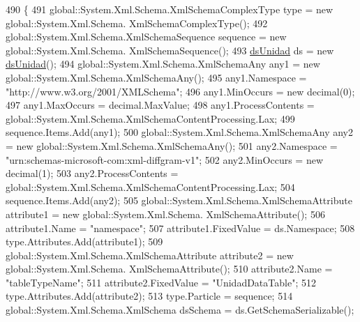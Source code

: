 \begin{DoxyCode}
490                                                                                                            
                               \{
491                 global::System.Xml.Schema.XmlSchemaComplexType type = \textcolor{keyword}{new} global::System.Xml.Schema.
      XmlSchemaComplexType();
492                 global::System.Xml.Schema.XmlSchemaSequence sequence = \textcolor{keyword}{new} global::System.Xml.Schema.
      XmlSchemaSequence();
493                 \hyperlink{class_proyecto___integrador__3_1_1ds_unidad_ab6be91d0b9503d2e08dacc48aaaf6446}{dsUnidad} ds = \textcolor{keyword}{new} \hyperlink{class_proyecto___integrador__3_1_1ds_unidad_ab6be91d0b9503d2e08dacc48aaaf6446}{dsUnidad}();
494                 global::System.Xml.Schema.XmlSchemaAny any1 = \textcolor{keyword}{new} global::System.Xml.Schema.XmlSchemaAny();
495                 any1.Namespace = \textcolor{stringliteral}{"http://www.w3.org/2001/XMLSchema"};
496                 any1.MinOccurs = \textcolor{keyword}{new} decimal(0);
497                 any1.MaxOccurs = decimal.MaxValue;
498                 any1.ProcessContents = global::System.Xml.Schema.XmlSchemaContentProcessing.Lax;
499                 sequence.Items.Add(any1);
500                 global::System.Xml.Schema.XmlSchemaAny any2 = \textcolor{keyword}{new} global::System.Xml.Schema.XmlSchemaAny();
501                 any2.Namespace = \textcolor{stringliteral}{"urn:schemas-microsoft-com:xml-diffgram-v1"};
502                 any2.MinOccurs = \textcolor{keyword}{new} decimal(1);
503                 any2.ProcessContents = global::System.Xml.Schema.XmlSchemaContentProcessing.Lax;
504                 sequence.Items.Add(any2);
505                 global::System.Xml.Schema.XmlSchemaAttribute attribute1 = \textcolor{keyword}{new} global::System.Xml.Schema.
      XmlSchemaAttribute();
506                 attribute1.Name = \textcolor{stringliteral}{"namespace"};
507                 attribute1.FixedValue = ds.Namespace;
508                 type.Attributes.Add(attribute1);
509                 global::System.Xml.Schema.XmlSchemaAttribute attribute2 = \textcolor{keyword}{new} global::System.Xml.Schema.
      XmlSchemaAttribute();
510                 attribute2.Name = \textcolor{stringliteral}{"tableTypeName"};
511                 attribute2.FixedValue = \textcolor{stringliteral}{"UnidadDataTable"};
512                 type.Attributes.Add(attribute2);
513                 type.Particle = sequence;
514                 global::System.Xml.Schema.XmlSchema dsSchema = ds.GetSchemaSerializable();

\end{DoxyCode}

